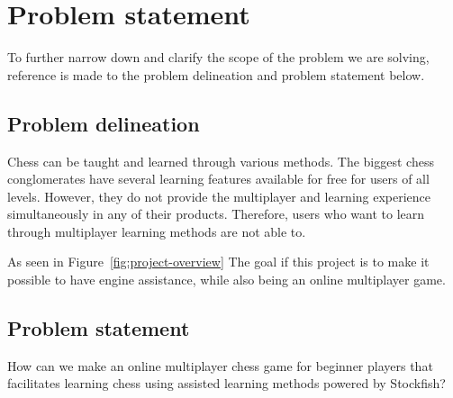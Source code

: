 \chapter{Problem statement}\label{ch:problem-statement}

To further narrow down and clarify the scope of the problem we are solving, reference is made to the problem delineation
and problem statement below.



\section{Problem delineation}\label{sec:problem-delineation}

Chess can be taught and learned through various methods.
The biggest chess conglomerates have several learning features available for free for users of all levels.
However, they do not provide the multiplayer and learning experience simultaneously in any of their products.
Therefore, users who want to learn through multiplayer learning methods are not able to.

As seen in Figure~\ref{fig:project-overview} The goal if this project is to make it possible to have engine
assistance, while also being an online multiplayer game.



\section{Problem statement}\label{sec:problem-statement}

\begin{tcolorbox}
    How can we make an online multiplayer chess game for beginner players that facilitates learning chess using
    assisted learning methods powered by Stockfish?
\end{tcolorbox}
